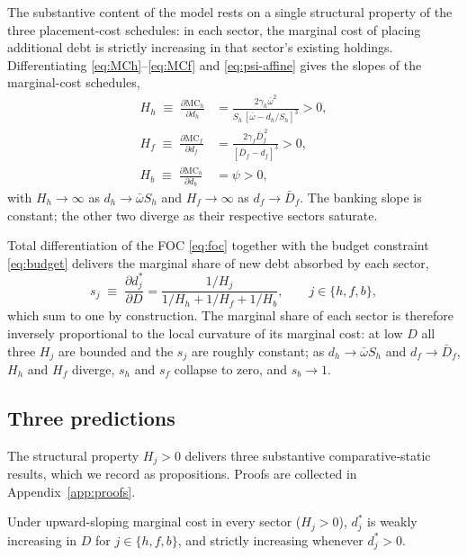 \documentclass[\latexroot/\projectname]{subfiles}
\begin{document}
The substantive content of the model rests on a single structural
property of the three placement-cost schedules: in each sector, the
marginal cost of placing additional debt is strictly increasing in
that sector's existing holdings. Differentiating
\eqref{eq:MCh}--\eqref{eq:MCf} and \eqref{eq:psi-affine} gives the
slopes of the marginal-cost schedules,
\begin{align}
  H_h \;\equiv\; \frac{\partial\text{MC}_h}{\partial d_h}
    &= \frac{2\gamma_h\bar\omega^{2}}
            {S_h\,[\bar\omega-d_h/S_h]^{3}}>0,
      \label{eq:Hh}\\
  H_f \;\equiv\; \frac{\partial\text{MC}_f}{\partial d_f}
    &= \frac{2\gamma_f\bar D_f^{\,2}}
            {[\bar D_f-d_f]^{3}}>0,
      \label{eq:Hf}\\
  H_b \;\equiv\; \frac{\partial\text{MC}_b}{\partial d_b} &= \psi>0,
      \label{eq:Hb}
\end{align}
with $H_h\to\infty$ as $d_h\to\bar\omega S_h$ and $H_f\to\infty$ as
$d_f\to\bar D_f$. The banking slope is constant; the other two
diverge as their respective sectors saturate.

Total differentiation of the FOC \eqref{eq:foc} together with the
budget constraint \eqref{eq:budget} delivers the marginal share of
new debt absorbed by each sector,
\begin{equation}\label{eq:shares}
  s_j \;\equiv\; \frac{\partial d_j^\ast}{\partial D}
  = \frac{1/H_j}{1/H_h + 1/H_f + 1/H_b},
  \qquad j\in\{h,f,b\},
\end{equation}
which sum to one by construction. The marginal share of each sector
is therefore inversely proportional to the local curvature of its
marginal cost: at low $D$ all three $H_j$ are bounded and the $s_j$
are roughly constant; as $d_h\to\bar\omega S_h$ and
$d_f\to\bar D_f$, $H_h$ and $H_f$ diverge, $s_h$ and $s_f$ collapse to
zero, and $s_b\to 1$.

\subsection{Three predictions}

The structural property $H_j>0$ delivers three substantive
comparative-static results, which we record as propositions.
Proofs are collected in Appendix~\ref{app:proofs}.

\begin{proposition}
\label{prop:monotone}
Under upward-sloping marginal cost in every sector ($H_j>0$),
$d_j^\ast$ is weakly increasing in $D$ for $j\in\{h,f,b\}$, and
strictly increasing whenever $d_j^\ast>0$.
\end{proposition}
\end{document}
